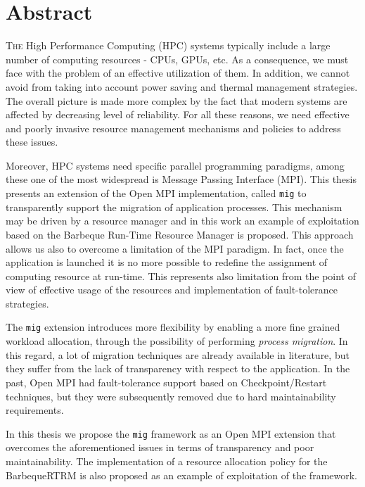\chapter*{Abstract}

\lettrine{T}{he} High Performance Computing (HPC) systems typically include
a large number of computing resources - CPUs, GPUs, etc. As a consequence,
we must face with the problem of an effective utilization of them. In addition,
we cannot avoid from taking into account power saving and thermal management
strategies. The overall picture is made more complex by the fact that modern
systems are affected by decreasing level of reliability. For all these reasons,
we need effective and poorly invasive resource management mechanisms and
policies to address these issues.

Moreover, HPC systems need specific parallel programming paradigms, among these one of
the most widespread is Message Passing Interface (MPI). This thesis presents
an extension of the Open MPI implementation, called \texttt{mig} to
transparently support
the migration of application processes. This mechanism may be driven by a
resource manager and in this work an example of exploitation based on the
Barbeque Run-Time Resource Manager is proposed. This approach allows us also
to overcome a limitation of the MPI paradigm. In fact, once the application is
launched it is no more possible to redefine the assignment of computing
resource at run-time. This represents also limitation from the point of view of
effective usage of the resources and implementation of fault-tolerance
strategies.

The \texttt{mig} extension introduces more flexibility by enabling a more fine grained workload allocation, through the possibility of performing
\emph{process migration}. In this regard, a lot of  migration techniques are already available
in  literature, but they suffer from the lack of
transparency with respect to the application. In the past, Open MPI had
fault-tolerance support based on Checkpoint/Restart techniques, but they were subsequently removed due to hard maintainability requirements.

In this thesis we propose the \texttt{mig} framework as an Open MPI extension
that overcomes the aforementioned issues in terms of transparency and poor
maintainability. The implementation of a resource allocation policy for the
BarbequeRTRM is also proposed as an example of exploitation of the framework.